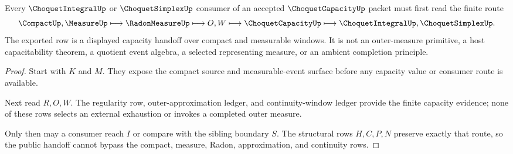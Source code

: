 \begin{theorem}
\label{thm:choquet-capacity-consumer-handoff}
Every $\ChoquetIntegralUp$ or $\ChoquetSimplexUp$ consumer of an accepted $\ChoquetCapacityUp$ packet must first read the finite route
$$
\CompactUp,\MeasureUp \longmapsto \RadonMeasureUp \longmapsto O,W \longmapsto \ChoquetCapacityUp \longmapsto \ChoquetIntegralUp,\ChoquetSimplexUp .
$$
The exported row is a displayed capacity handoff over compact and measurable windows. It is not an outer-measure primitive, a host capacitability theorem, a quotient event algebra, a selected representing measure, or an ambient completion principle.
\end{theorem}
\begin{proof}
Start with $K$ and $M$. They expose the compact source and measurable-event surface before any capacity value or consumer route is available.

Next read $R,O,W$. The regularity row, outer-approximation ledger, and continuity-window ledger provide the finite capacity evidence; none of these rows selects an external exhaustion or invokes a completed outer measure.

Only then may a consumer reach $I$ or compare with the sibling boundary $S$. The structural rows $H,C,P,N$ preserve exactly that route, so the public handoff cannot bypass the compact, measure, Radon, approximation, and continuity rows.
\end{proof}




